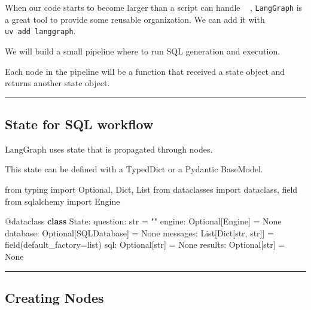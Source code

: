 \documentclass[
  letterpaper,
  DIV=11,
  numbers=noendperiod]{scrartcl}
\newenvironment{Shaded}{\begin{snugshade}}{\end{snugshade}}
\newcommand{\AttributeTok}[1]{\textcolor[rgb]{0.40,0.45,0.13}{#1}}
\newcommand{\BuiltInTok}[1]{\textcolor[rgb]{0.00,0.23,0.31}{#1}}
\newcommand{\ImportTok}[1]{\textcolor[rgb]{0.00,0.46,0.62}{#1}}
\newcommand{\KeywordTok}[1]{\textcolor[rgb]{0.00,0.23,0.31}{\textbf{#1}}}
\newcommand{\NormalTok}[1]{\textcolor[rgb]{0.00,0.23,0.31}{#1}}
\newcommand{\OperatorTok}[1]{\textcolor[rgb]{0.37,0.37,0.37}{#1}}
\newcommand{\StringTok}[1]{\textcolor[rgb]{0.13,0.47,0.30}{#1}}
\newcommand{\VariableTok}[1]{\textcolor[rgb]{0.07,0.07,0.07}{#1}}
\begin{document}
When our code starts to become larger than a script can handle 🏋🏾‍♀️,
\texttt{LangGraph} is a great tool to provide some reusable
organization. We can add it with \texttt{uv\ add\ langgraph}.

We will build a small pipeline where to run SQL generation and
execution.

Each node in the pipeline will be a function that received a state
object and returns another state object.

\begin{center}\rule{0.5\linewidth}{0.5pt}\end{center}

\subsection{State for SQL workflow}\label{state-for-sql-workflow}

LangGraph uses state that is propagated through nodes.

This state can be defined with a TypedDict or a Pydantic BaseModel.

\begin{Shaded}
\begin{Highlighting}[]
\ImportTok{from}\NormalTok{ typing }\ImportTok{import}\NormalTok{ Optional, Dict, List}
\ImportTok{from}\NormalTok{ dataclasses }\ImportTok{import}\NormalTok{ dataclass, field}
\ImportTok{from}\NormalTok{ sqlalchemy }\ImportTok{import}\NormalTok{ Engine}

\AttributeTok{@dataclass}
\KeywordTok{class}\NormalTok{ State:}
\NormalTok{    question: }\BuiltInTok{str} \OperatorTok{=} \StringTok{""}
\NormalTok{    engine: Optional[Engine] }\OperatorTok{=} \VariableTok{None}
\NormalTok{    database: Optional[SQLDatabase] }\OperatorTok{=} \VariableTok{None}
\NormalTok{    messages: List[Dict[}\BuiltInTok{str}\NormalTok{, }\BuiltInTok{str}\NormalTok{]] }\OperatorTok{=}\NormalTok{ field(default\_factory}\OperatorTok{=}\BuiltInTok{list}\NormalTok{)}
\NormalTok{    sql: Optional[}\BuiltInTok{str}\NormalTok{] }\OperatorTok{=} \VariableTok{None}
\NormalTok{    results: Optional[}\BuiltInTok{str}\NormalTok{] }\OperatorTok{=} \VariableTok{None}
\end{Highlighting}
\end{Shaded}

\begin{center}\rule{0.5\linewidth}{0.5pt}\end{center}

\subsection{Creating Nodes}\label{creating-nodes}
\end{document}
